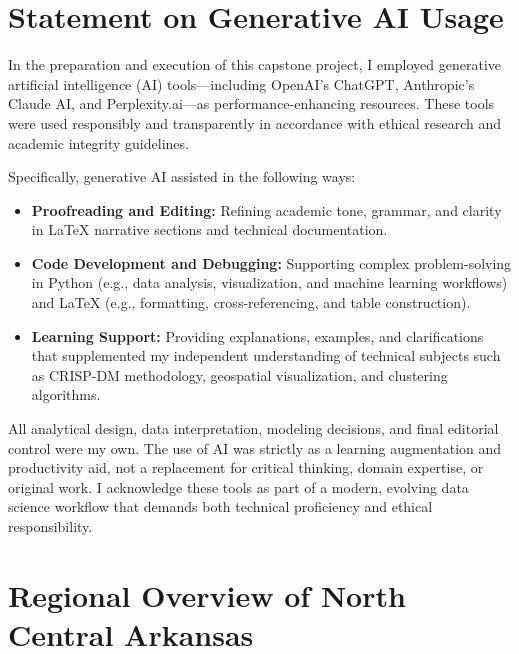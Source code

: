 \appendix
{}
\renewcommand{\thesection}{\Alph{section}}

\section{Statement on Generative AI Usage}
In the preparation and execution of this capstone project, I employed generative artificial intelligence (AI) tools—including OpenAI's ChatGPT, Anthropic's Claude AI, and Perplexity.ai—as performance-enhancing resources. These tools were used responsibly and transparently in accordance with ethical research and academic integrity guidelines.

Specifically, generative AI assisted in the following ways:
\begin{itemize}
    \item \textbf{Proofreading and Editing:} Refining academic tone, grammar, and clarity in LaTeX narrative sections and technical documentation.
    \item \textbf{Code Development and Debugging:} Supporting complex problem-solving in Python (e.g., data analysis, visualization, and machine learning workflows) and LaTeX (e.g., formatting, cross-referencing, and table construction).
    \item \textbf{Learning Support:} Providing explanations, examples, and clarifications that supplemented my independent understanding of technical subjects such as CRISP-DM methodology, geospatial visualization, and clustering algorithms.
\end{itemize}

All analytical design, data interpretation, modeling decisions, and final editorial control were my own. The use of AI was strictly as a learning augmentation and productivity aid, not a replacement for critical thinking, domain expertise, or original work. I acknowledge these tools as part of a modern, evolving data science workflow that demands both technical proficiency and ethical responsibility.


\section{Regional Overview of North Central Arkansas}

